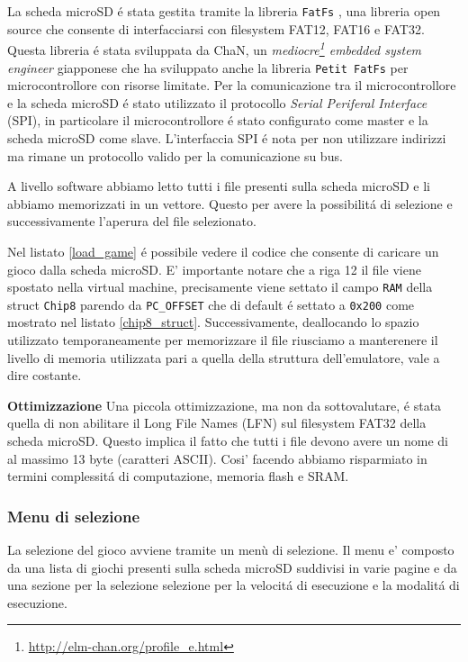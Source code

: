 \documentclass[a4paper]{article}
\begin{document}
La scheda microSD é stata gestita tramite la libreria \texttt{FatFs} \cite{elm-chan:fatfs}, una libreria open source che consente di interfacciarsi con filesystem FAT12, FAT16 e FAT32. Questa libreria é stata sviluppata da ChaN, un \textit{mediocre\footnote{\url{http://elm-chan.org/profile_e.html}} embedded system engineer} giapponese che ha sviluppato anche la libreria \texttt{Petit FatFs} per microcontrollore con risorse limitate.
Per la comunicazione tra il microcontrollore e la scheda microSD é stato utilizzato il protocollo \textit{Serial Periferal Interface} (SPI), in particolare il microcontrollore é stato configurato come master e la scheda microSD come slave. L'interfaccia SPI é nota per non utilizzare indirizzi ma rimane un protocollo valido per la comunicazione su bus.

A livello software abbiamo letto tutti i file presenti sulla scheda microSD e li abbiamo memorizzati in un vettore. Questo per avere la possibilitá di selezione e successivamente l'aperura del file selezionato.

Nel listato \ref{load_game} é possibile vedere il codice che consente di caricare un gioco dalla scheda microSD. E' importante notare che a riga 12 il file viene spostato nella virtual machine, precisamente viene settato il campo \texttt{RAM} della struct \texttt{Chip8} parendo da \texttt{PC\_OFFSET} che di default é settato a \texttt{0x200} come mostrato nel listato \ref{chip8_struct}. Successivamente, deallocando lo spazio utilizzato temporaneamente per memorizzare il file riusciamo a manterenere il livello di memoria utilizzata pari a quella della struttura dell'emulatore, vale a dire costante.

\textbf{Ottimizzazione} \quad  Una piccola ottimizzazione, ma non da sottovalutare, é stata quella di non abilitare il Long File Names (LFN) sul filesystem FAT32 della scheda microSD. Questo implica il fatto che tutti i file devono avere un nome di al massimo 13 byte (caratteri ASCII). Cosi' facendo abbiamo risparmiato in termini complessitá di computazione, memoria flash e SRAM.

\subsubsection{Menu di selezione}

La selezione del gioco avviene tramite un menù di selezione. Il menu e' composto da una lista di giochi presenti sulla scheda microSD suddivisi in varie pagine e da una sezione per la selezione selezione per la velocitá di esecuzione e la modalitá di esecuzione.
\end{document}
